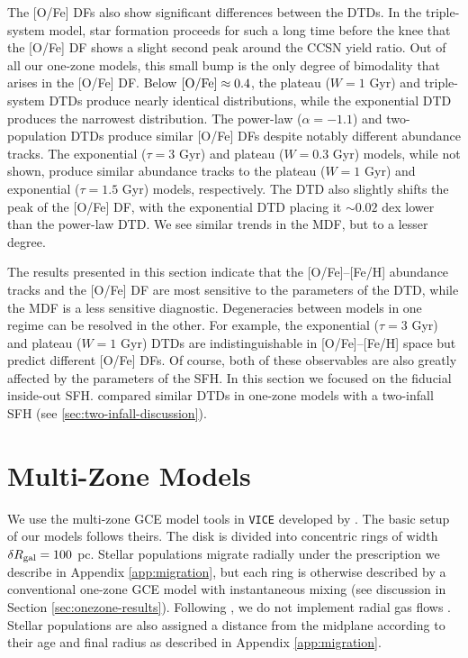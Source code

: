 \documentclass[twocolumn,twocolappendix,linenumbers]{aastex631}
\newcommand{\vice}{{\tt VICE}\xspace}
\begin{document}
The [O/Fe] DFs also show significant differences between the DTDs. In the triple-system model, star formation proceeds for such a long time before the knee that the [O/Fe] DF shows a slight second peak around the CCSN yield ratio. Out of all our one-zone models, this small bump is the only degree of bimodality that arises in the [O/Fe] DF. Below ${\rm [O/Fe]}\approx0.4$, the plateau ($W=1$ Gyr) and triple-system DTDs produce nearly identical distributions, while the exponential DTD produces the narrowest distribution. The power-law ($\alpha=-1.1$) and two-population DTDs produce similar [O/Fe] DFs despite notably different abundance tracks. The exponential ($\tau=3$ Gyr) and plateau ($W=0.3$ Gyr) models, while not shown, produce similar abundance tracks to the plateau ($W=1$ Gyr) and exponential ($\tau=1.5$ Gyr) models, respectively.
The DTD also slightly shifts the peak of the [O/Fe] DF, with the exponential DTD placing it $\sim 0.02$ dex lower than the power-law DTD. We see similar trends in the MDF, but to a lesser degree.

The results presented in this section indicate that the [O/Fe]--[Fe/H] abundance tracks and the [O/Fe] DF are most sensitive to the parameters of the DTD, while the MDF is a less sensitive diagnostic. Degeneracies between models in one regime can be resolved in the other. For example, the exponential ($\tau=3$ Gyr) and plateau ($W=1$ Gyr) DTDs are indistinguishable in [O/Fe]--[Fe/H] space but predict different [O/Fe] DFs. Of course, both of these observables are also greatly affected by the parameters of the SFH. In this section we focused on the fiducial inside-out SFH. \citet{Palicio2023-AnalyticDTD} compared similar DTDs in one-zone models with a two-infall SFH (see \ref{sec:two-infall-discussion}).

\section{Multi-Zone Models}
\label{sec:multizone-results}

We use the multi-zone GCE model tools in \vice developed by . The basic setup of our models follows theirs. The disk is divided into concentric rings of width $\delta R_{\rm gal}=100$ pc. Stellar populations migrate radially under the prescription we describe in Appendix \ref{app:migration}, but each ring is otherwise described by a conventional one-zone GCE model with instantaneous mixing (see discussion in Section \ref{sec:onezone-results}). Following , we do not implement radial gas flows \citep[e.g.,][]{LaceyFall1985-RadialGasFlows,BilitewskiSchonrich2012-RadialFlows}. Stellar populations are also assigned a distance from the midplane according to their age and final radius as described in Appendix \ref{app:migration}.
\end{document}
